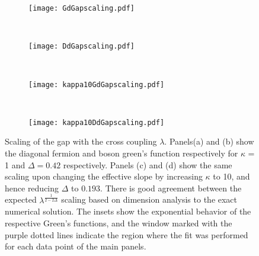 %
\begin{figure}[h]
    \centering
    \begin{subfigure}[t]{0.2\textwidth}
        \centering
        \texttt{[image: GdGapscaling.pdf]}
        \caption{}
        \label{fig:ImagTimeGapscalingGkappa1}
    \end{subfigure}
    ~\begin{subfigure}[t]{0.2\textwidth}
        \centering
        \texttt{[image: DdGapscaling.pdf]}
        \caption{}
        \label{ImagTimeGapscalingDkappa1}
    \end{subfigure}
    ~\begin{subfigure}[t]{0.2\textwidth}
        \centering
        \texttt{[image: kappa10GdGapscaling.pdf]}
        \caption{}
        \label{fig:ImagTimeGapscalingGkappa10}
    \end{subfigure}
    ~\begin{subfigure}[t]{0.2\textwidth}
        \centering
        \texttt{[image: kappa10DdGapscaling.pdf]}
        \caption{}
        \label{ImagTimeGapscalingDkappa10}
    \end{subfigure}
    \caption{Scaling of the gap with the cross coupling $\lambda$. Panels(a) and (b) show the diagonal fermion and boson green's function respectively for $\kappa$ = 1 and $\Delta = 0.42$ respectively. Panels (c) and (d) show the same scaling upon changing the effective slope by increasing $\kappa$ to 10, and hence reducing $\Delta$ to $0.193$. There is good agreement between the expected $\lambda^{\frac{1}{2-2\Delta}}$ scaling based on dimension analysis to the exact numerical solution. The insets show the exponential behavior of the respective Green's functions, and the window marked with the purple dotted lines indicate the region where the fit was performed for each data point of the main panels.}
    \label{fig:ImagTimeScaling}
\end{figure}
%
